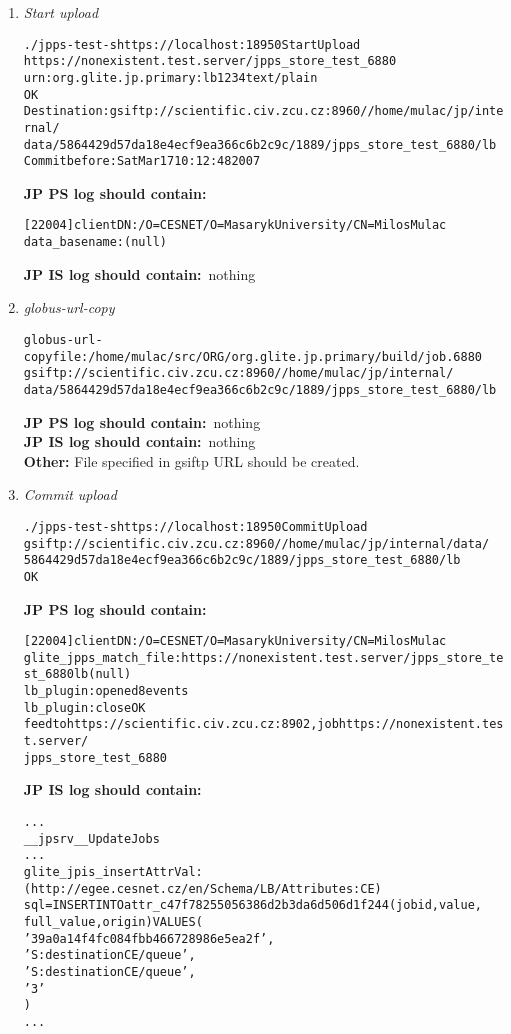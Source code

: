 \documentclass{egee}
\def\jpps{\noindent\textbf{JP PS log should contain:}}
\def\jpis{\noindent\textbf{JP IS log should contain:}}
\begin{document}
\begin{enumerate}
 \item \emph{Start upload}
  \begin{alltt}
	./jpps-test -s https://localhost:18950 StartUpload 
	https://nonexistent.test.server/jpps_store_test_6880 
	urn:org.glite.jp.primary:lb 1234 text/plain
	OK
	Destination: gsiftp://scientific.civ.zcu.cz:8960//home/mulac/jp/internal/
	data/5864429d57da18e4ecf9ea366c6b2c9c/1889/jpps_store_test_6880/lb
	Commit before: Sat Mar 17 10:12:48 2007
  \end{alltt}
  \jpps\
  \begin{alltt}
	[22004] client DN: /O=CESNET/O=Masaryk University/CN=Milos Mulac
	data_basename: (null)
  \end{alltt}
  \jpis\
	nothing
 \item \emph{globus-url-copy}
  \begin{alltt}
	globus-url-copy file:/home/mulac/src/ORG/org.glite.jp.primary/build/job.6880
	gsiftp://scientific.civ.zcu.cz:8960//home/mulac/jp/internal/
	data/5864429d57da18e4ecf9ea366c6b2c9c/1889/jpps_store_test_6880/lb
  \end{alltt}
  \jpps\
	nothing \\
  \jpis\
	nothing \\
  \noindent\textbf{Other:}
	File specified in gsiftp URL should be created.
 \item \emph{Commit upload}
  \begin{alltt}
	./jpps-test -s https://localhost:18950 CommitUpload 
	gsiftp://scientific.civ.zcu.cz:8960//home/mulac/jp/internal/data/
	5864429d57da18e4ecf9ea366c6b2c9c/1889/jpps_store_test_6880/lb
	OK
  \end{alltt}
  \jpps\
  \begin{alltt}
	[22004] client DN: /O=CESNET/O=Masaryk University/CN=Milos Mulac
	glite_jpps_match_file: https://nonexistent.test.server/jpps_store_test_6880 lb (null)
	lb_plugin: opened 8 events
	lb_plugin: close OK
	feed to https://scientific.civ.zcu.cz:8902, job https://nonexistent.test.server/
	jpps_store_test_6880
  \end{alltt}
  \jpis\
  \begin{alltt}
	...
	__jpsrv__UpdateJobs
	...
	glite_jpis_insertAttrVal: (http://egee.cesnet.cz/en/Schema/LB/Attributes:CE) 
	sql=INSERT INTO attr_c47f78255056386d2b3da6d506d1f244 (jobid, value, 
	full_value, origin) VALUES (
        '39a0a14f4fc084fbb466728986e5ea2f',
        'S:destination CE/queue',
        'S:destination CE/queue',
        '3'
	)
	...
  \end{alltt}
 \end{enumerate}
\end{document}
